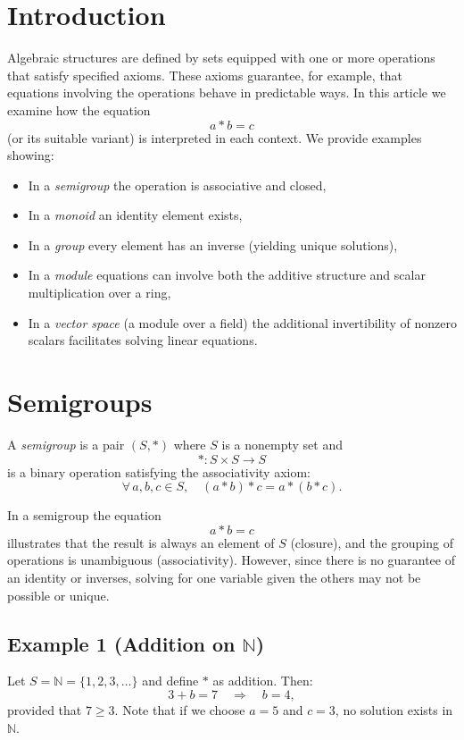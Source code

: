 \documentclass[11pt,openany]{article}
\begin{document}
\section{Introduction}
Algebraic structures are defined by sets equipped with one or more operations that satisfy specified axioms. These axioms guarantee, for example, that equations involving the operations behave in predictable ways. In this article we examine how the equation
\[
a\ast b = c
\]
(or its suitable variant) is interpreted in each context. We provide examples showing:
\begin{itemize}
	\item In a \emph{semigroup} the operation is associative and closed,
	\item In a \emph{monoid} an identity element exists,
	\item In a \emph{group} every element has an inverse (yielding unique solutions),
	\item In a \emph{module} equations can involve both the additive structure and scalar multiplication over a ring,
	\item In a \emph{vector space} (a module over a field) the additional invertibility of nonzero scalars facilitates solving linear equations.
\end{itemize}

\section{Semigroups}
\begin{definition}[Semigroup]
	A \emph{semigroup} is a pair \((S,\ast)\) where \(S\) is a nonempty set and
	\[
	\ast: S \times S \to S
	\]
	is a binary operation satisfying the associativity axiom:
	\[
	\forall\, a,b,c \in S,\quad (a\ast b)\ast c = a\ast (b\ast c).
	\]
\end{definition}

In a semigroup the equation
\[
a\ast b = c
\]
illustrates that the result is always an element of \(S\) (closure), and the grouping of operations is unambiguous (associativity). However, since there is no guarantee of an identity or inverses, solving for one variable given the others may not be possible or unique.

\subsection*{Example 1 (Addition on \(\mathbb{N}\))} 
Let \(S=\mathbb{N}=\{1,2,3,\dots\}\) and define \(\ast\) as addition. Then:
\[
3+ b = 7 \quad \Longrightarrow \quad b=4,
\]
provided that \(7\ge 3\). Note that if we choose \(a=5\) and \(c=3\), no solution exists in \(\mathbb{N}\).
\end{document}
